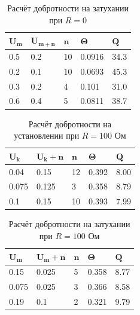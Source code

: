 \documentclass[10pt,a4paper]{article}
\begin{document}
\begin{table}[h!]
	\centering
	\begin{tabular}{|l|l|l|l|l|}
		\hline
		$\mathbf{U_m}$ & $\mathbf{U_{m+n}}$ & $\mathbf{n}$ & $\mathbf{\Theta}$ & $\mathbf{Q}$ \\ \hline
		0.5            & 0.2              & 10           & 0.0916            & 34.3         \\ \hline
		0.2            & 0.1              & 10           & 0.0693            & 45.3         \\ \hline
		0.3            & 0.2              & 4            & 0.101             & 31.0         \\ \hline
		0.6            & 0.4              & 5            & 0.0811            & 38.7         \\ \hline
	\end{tabular}
\caption{Расчёт добротности на затухании при $R=0$}
\end{table}

\begin{table}[h!]
	\centering
	\begin{tabular}{|l|l|l|l|l|}
		\hline
		$\mathbf{U_k}$ & $\mathbf{U_k+n}$ & $\mathbf{n}$ & $\mathbf{\Theta}$ & $\mathbf{Q}$ \\ \hline
		0.04           & 0.15             & 12           & 0.392             & 8.00         \\ \hline
		0.075          & 0.125            & 3            & 0.358             & 8.79         \\ \hline
		0.1            & 0.15             & 10           & 0.393             & 7.99         \\ \hline
	\end{tabular}
\caption{Расчёт добротности на установлении при $R=100$ Ом}
\end{table}

\begin{table}[h!]
	\centering
	\begin{tabular}{|l|l|l|l|l|}
		\hline
		$\mathbf{U_m}$ & $\mathbf{U_m+n}$ & $\mathbf{n}$ & $\mathbf{\Theta}$ & $\mathbf{Q}$ \\ \hline
		0.15           & 0.025            & 5            & 0.358             & 8.77         \\ \hline
		0.075          & 0.025            & 3            & 0.366             & 8.58         \\ \hline
		0.19           & 0.1              & 2            & 0.321             & 9.79         \\ \hline
	\end{tabular}
\caption{Расчёт добротности на затухании при $R=100$ Ом}
\end{table}
\end{document}
